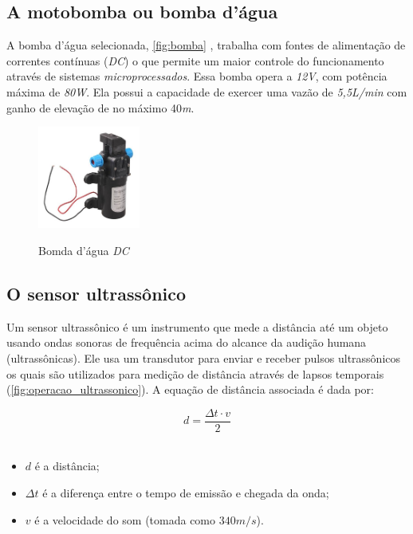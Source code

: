 \subsection{A motobomba ou bomba d'água}

A bomba d'água selecionada, \autoref{fig:bomba} , trabalha com fontes de alimentação de correntes contínuas (\textit{DC}) o que permite um maior controle do funcionamento através de sistemas \textit{microprocessados}. Essa bomba opera a \textit{12V}, com potência máxima de \textit{80W}. Ela possui a capacidade de exercer uma vazão de \textit{5,5L/min} com ganho de elevação de no máximo 40\textit{m}.

\begin{figure}[H]
	\centering
	\caption{Bomda d'água \textit{DC}}
	\includegraphics[width=0.3\textwidth]{figuras/bomba.jpeg}
	\label{fig:bomba}
\end{figure}

\subsection{O sensor ultrassônico}
\label{ssec:sensor_ultra}

Um sensor ultrassônico é um instrumento que mede a distância até um objeto usando ondas sonoras de frequência acima do alcance da audição humana (ultrassônicas). Ele usa um transdutor para enviar e receber pulsos ultrassônicos os quais são utilizados para medição de distância através de lapsos temporais (\autoref{fig:operacao_ultrassonico}). A equação de distância associada é dada por:

\begin{equation}
d = \frac{\Delta t \cdot v}{2}
\end{equation}
\\
\begin{itemize}
	
	\item $d$ é a distância;
	\item $\Delta t$ é a diferença entre o tempo de emissão e chegada da onda;
	\item  $v$ é a velocidade do som (tomada como $340m/s$). \\
\end{itemize}





